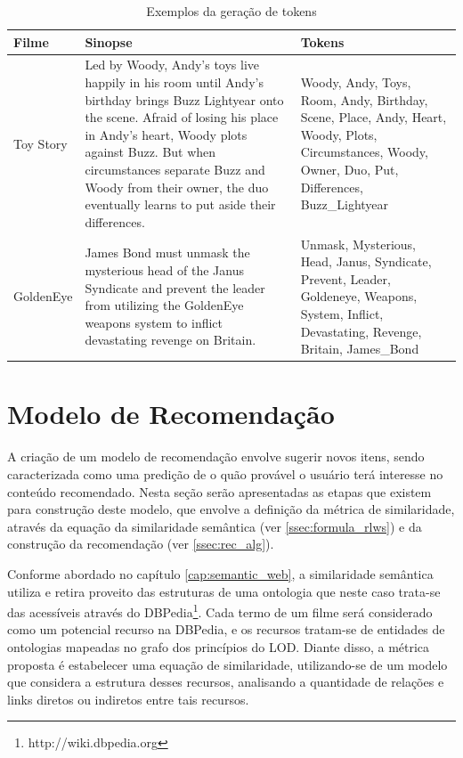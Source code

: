 \begin{table}[H]
	\centering
	\caption{Exemplos da geração de tokens}
	\def\arraystretch{1.3} %
	\begin{tabular}{|p{2cm}|p{6cm}|p{6cm}|}
	\hline
	\textbf{Filme} & \textbf{Sinopse} & \textbf{Tokens} \\ \hline
	Toy Story & Led by Woody, Andy's toys live happily in his room until Andy's birthday brings Buzz Lightyear onto the scene. Afraid of losing his place in Andy's heart, Woody plots against Buzz. But when circumstances separate Buzz and Woody from their owner, the duo eventually learns to put aside their differences.& Woody, Andy, Toys, Room, Andy, Birthday, Scene, Place, Andy, Heart, Woody, Plots, Circumstances, Woody, Owner, Duo, Put, Differences, Buzz\_Lightyear \\ \hline
	GoldenEye & James Bond must unmask the mysterious head of the Janus Syndicate and prevent the leader from utilizing the GoldenEye weapons system to inflict devastating revenge on Britain. & Unmask, Mysterious, Head, Janus, Syndicate, Prevent, Leader, Goldeneye, Weapons, System, Inflict, Devastating, Revenge, Britain, James\_Bond \\ \hline
	\end{tabular}
\label{tab:nlp_example}
\end{table}

\section{Modelo de Recomendação}
\label{ssec:sim_rec}

A criação de um modelo de recomendação envolve sugerir novos itens, sendo caracterizada como uma predição de o quão provável o usuário terá interesse no conteúdo recomendado. Nesta seção serão apresentadas as etapas que existem para construção deste modelo, que envolve a definição da métrica de similaridade, através da equação da similaridade semântica (ver \ref{ssec:formula_rlws}) e da construção da recomendação (ver \ref{ssec:rec_alg}).

Conforme abordado no capítulo \ref{cap:semantic_web}, a similaridade semântica utiliza e retira proveito das estruturas de uma ontologia que neste caso trata-se das acessíveis através do DBPedia\footnote{http://wiki.dbpedia.org}. Cada termo de um filme será considerado como um potencial recurso na DBPedia, e os recursos tratam-se de entidades de ontologias mapeadas no grafo dos princípios do \ac{LOD}. Diante disso, a métrica proposta é estabelecer uma equação de similaridade, utilizando-se de um modelo que considera a estrutura desses recursos, analisando a quantidade de relações e links diretos ou indiretos entre tais recursos. 

